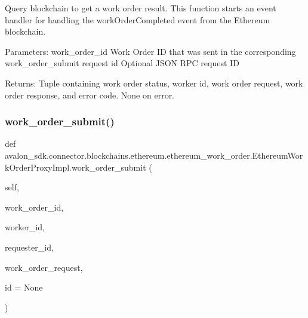 \begin{DoxyVerb}Query blockchain to get a work order result.
This function starts an event handler for handling the
workOrderCompleted event from the Ethereum blockchain.

Parameters:
work_order_id Work Order ID that was sent in the
      corresponding work_order_submit request
id            Optional JSON RPC request ID

Returns:
Tuple containing work order status, worker id, work order request,
work order response, and error code.
None on error.
\end{DoxyVerb}
 \mbox{\label{classavalon__sdk_1_1connector_1_1blockchains_1_1ethereum_1_1ethereum__work__order_1_1EthereumWorkOrderProxyImpl_a22f3deec94be323b4ed4417f7ba1e7df}} 
\subsubsection{\texorpdfstring{work\+\_\+order\+\_\+submit()}{work\_order\_submit()}}
{\footnotesize\ttfamily def avalon\+\_\+sdk.\+connector.\+blockchains.\+ethereum.\+ethereum\+\_\+work\+\_\+order.\+Ethereum\+Work\+Order\+Proxy\+Impl.\+work\+\_\+order\+\_\+submit (\begin{DoxyParamCaption}\item[{}]{self,  }\item[{}]{work\+\_\+order\+\_\+id,  }\item[{}]{worker\+\_\+id,  }\item[{}]{requester\+\_\+id,  }\item[{}]{work\+\_\+order\+\_\+request,  }\item[{}]{id = {\ttfamily None} }\end{DoxyParamCaption})}

